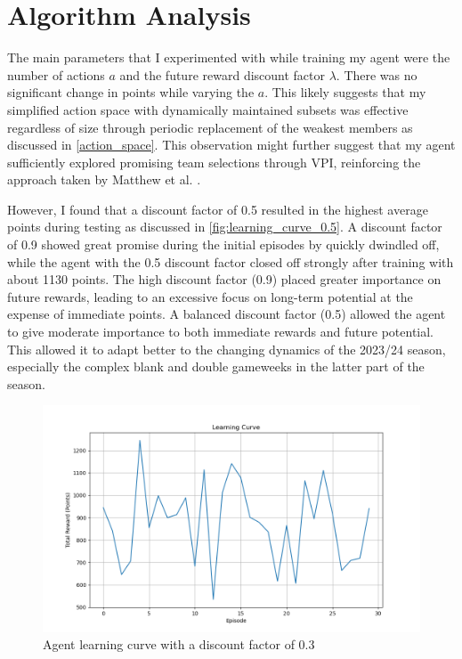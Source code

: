 \section{Algorithm Analysis}
The main parameters that I experimented with while training my agent were the number of actions $a$ and the future reward discount factor $\lambda$. There was no significant change in points while varying the $a$. This likely suggests that my simplified action space with dynamically maintained subsets was effective regardless of size through periodic replacement of the weakest members as discussed in \ref{action_space}. This observation might further suggest that my agent sufficiently explored promising team selections through VPI, reinforcing the approach taken by Matthew et al. \cite{matthews2012}.

However, I found that a discount factor of 0.5 resulted in the highest average points during testing as discussed in \ref{fig:learning_curve_0.5}. A discount factor of 0.9 showed great promise during the initial episodes by quickly dwindled off, while the agent with the 0.5 discount factor closed off strongly after training with about 1130 points. The high discount factor (0.9) placed greater importance on future rewards, leading to an excessive focus on long-term potential at the expense of immediate points. A balanced discount factor (0.5) allowed the agent to give moderate importance to both immediate rewards and future potential. This allowed it to adapt better to the changing dynamics of the 2023/24 season, especially the complex blank and double gameweeks in the latter part of the season.

\begin{figure}[h]
    \centering
    \includegraphics[width=1.0\textwidth]{figs/learning_curve_0.3.png}
    \vskip 0.2in
    \caption{Agent learning curve with a discount factor of 0.3}
    \label{fig:learning_curve_0.3}
\end{figure}

